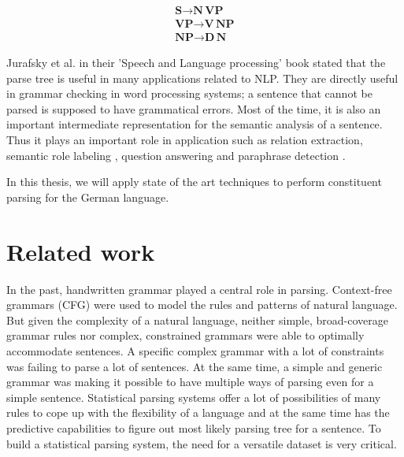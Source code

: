 \documentclass[a4paper, 11pt]{article}
\begin{document}
\begin{align*}
\textbf{S} \rightarrow \textbf{N} \, \textbf{VP} \\
\textbf{VP} \rightarrow \textbf{V} \, \textbf{NP} \\
\textbf{NP} \rightarrow \textbf{D} \, \textbf{N} 
\end{align*}

Jurafsky et al. \parencite{Jurafsky2008} in their 'Speech and Language processing' book stated that the parse tree is useful in many applications related to NLP. They are directly useful in grammar checking in word processing systems; a sentence that cannot be parsed is supposed to have grammatical errors. Most of the time, it is also an important intermediate representation for the semantic analysis of a sentence. Thus it plays an important role in application such as relation extraction, semantic role labeling \parencite{Gildea:2002:NPP:1073083.1073124}, question answering and paraphrase detection \parencite{Callison-Burch2010}.


In this thesis, we will apply state of the art techniques to perform constituent parsing for the German language.


\pagebreak
\section{Related work}

In the past, handwritten grammar played a central role in parsing. Context-free grammars (CFG) were used to model the rules and patterns of natural language. But given the complexity of a natural language, neither simple, broad-coverage grammar rules nor complex, constrained grammars were able to optimally accommodate sentences. A specific complex grammar with a lot of constraints was failing to parse a lot of sentences. At the same time, a simple and generic grammar was making it possible to have multiple ways of parsing even for a simple sentence. Statistical parsing systems offer a lot of possibilities of many rules to cope up with the flexibility of a language and at the same time has the predictive capabilities to figure out most likely parsing tree for a sentence. To build a statistical parsing system, the need for a versatile dataset is very critical. 
\end{document}
